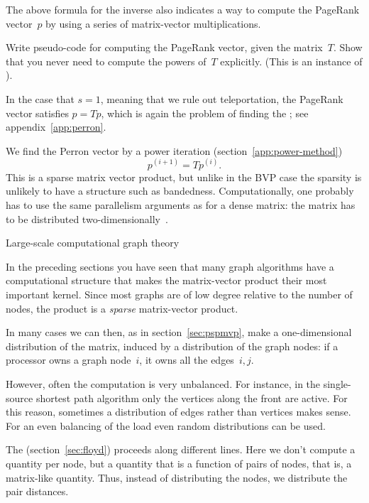 The above formula for the inverse also indicates a way to compute the
PageRank vector~$p$ by using a series of matrix-vector
multiplications.

\begin{exercise}
  Write pseudo-code for computing the PageRank vector, given the
  matrix~$T$. Show that you never need to compute the powers of~$T$
  explicitly. (This is an instance of ).
\end{exercise}

In the case that $s=1$, meaning that we rule out teleportation, the
PageRank vector satisfies $p=Tp$, which is again the problem of
finding the ; see appendix~\ref{app:perron}.

We find the Perron vector by a power iteration (section~\ref{app:power-method})
\[ p^{(i+1)} = T p^{(i)}. \]
This is a sparse matrix vector product, but unlike in the \ac{BVP}
case the sparsity is unlikely to have a structure such as
bandedness. Computationally, one probably has to use the same
parallelism arguments as for a dense matrix: the matrix has to be
distributed two-dimensionally~\cite{OgAi:sparsestorage}.


 {Large-scale computational graph theory}
\label{sec:random-graph-product}

In the preceding sections you have seen that many graph algorithms
have a computational structure that makes the matrix-vector product
their most important kernel. Since most graphs are of low degree 
relative to the number of nodes, the product is a \emph{sparse}
matrix-vector product.

In many cases we can then, as in section~\ref{sec:pspmvp},
make a one-dimensional distribution of the matrix,
induced by a distribution of the graph nodes: if a processor
owns a graph node~$i$, it owns all the edges~$i,j$.

However, often the computation is very unbalanced. For instance,
in the single-source shortest path algorithm only the vertices
along the front are active. For this reason, sometimes a distribution
of edges rather than vertices makes sense. For an even balancing
of the load even random distributions can be used.

The 
(section~\ref{sec:floyd}) proceeds along different lines. Here we don't
compute a quantity per node, but a quantity that is a function of pairs
of nodes, that is, a matrix-like quantity. Thus, instead of distributing
the nodes, we distribute the pair distances.

